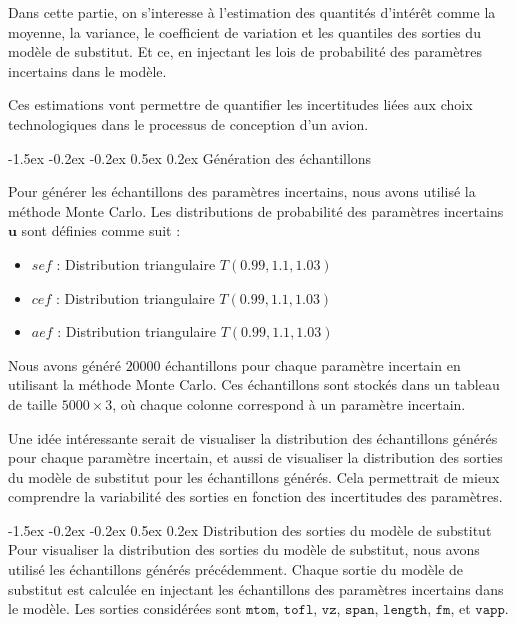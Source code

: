 \documentclass[a4paper, 11pt]{article}
\makeatletter
\newcounter{subsubsubsection}[subsubsection]
\newcommand\subsubsubsection{\@startsection{subsubsubsection}{4}{\z@}%
    {-1.5ex \@plus -0.2ex \@minus -0.2ex}%
    {0.5ex \@plus 0.2ex}%
    {\normalfont\normalsize\bfseries}}%
\makeatother
\begin{document}
Dans cette partie, on s'interesse à l'estimation des quantités d'intérêt comme la moyenne, la variance, le coefficient de variation et les quantiles des sorties du modèle de substitut. Et ce, en injectant les lois de probabilité des paramètres incertains dans le modèle. \newline

Ces estimations vont permettre de quantifier les incertitudes liées aux choix technologiques dans le processus de conception d’un avion.

\subsubsubsection{Génération des échantillons}

Pour générer les échantillons des paramètres incertains, nous avons utilisé la méthode Monte Carlo. Les distributions de probabilité des paramètres incertains \( \mathbf{u} \) sont définies comme suit :
\begin{itemize}
    \item \( sef \) : Distribution triangulaire \( T(0.99, 1.1, 1.03) \)
    \item \( cef \) : Distribution triangulaire \( T(0.99, 1.1, 1.03) \)
    \item \( aef \) : Distribution triangulaire \( T(0.99, 1.1, 1.03) \)
\end{itemize}



Nous avons généré $20000$ échantillons pour chaque paramètre incertain en utilisant la méthode Monte Carlo. Ces échantillons sont stockés dans un tableau de taille \( 5000 \times 3 \), où chaque colonne correspond à un paramètre incertain. \newline

Une idée intéressante serait de visualiser la distribution des échantillons générés pour chaque paramètre incertain, et aussi de visualiser la distribution des sorties du modèle de substitut pour les échantillons générés. Cela permettrait de mieux comprendre la variabilité des sorties en fonction des incertitudes des paramètres.


\subsubsubsection{Distribution des sorties du modèle de substitut}
Pour visualiser la distribution des sorties du modèle de substitut, nous avons utilisé les échantillons générés précédemment. Chaque sortie du modèle de substitut est calculée en injectant les échantillons des paramètres incertains dans le modèle. Les sorties considérées sont \( \texttt{mtom} \), \( \texttt{tofl} \), \( \texttt{vz} \), \( \texttt{span} \), \( \texttt{length} \), \( \texttt{fm} \), et \( \texttt{vapp} \).
\end{document}
